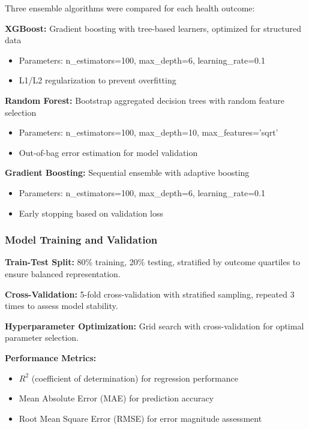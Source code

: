 \documentclass[11pt,a4paper]{article}
\begin{document}
Three ensemble algorithms were compared for each health outcome:

\textbf{XGBoost:} Gradient boosting with tree-based learners, optimized for structured data \cite{chen2016xgboost}
\begin{itemize}
\item Parameters: n\_estimators=100, max\_depth=6, learning\_rate=0.1
\item L1/L2 regularization to prevent overfitting
\end{itemize}

\textbf{Random Forest:} Bootstrap aggregated decision trees with random feature selection \cite{breiman2001random}
\begin{itemize}
\item Parameters: n\_estimators=100, max\_depth=10, max\_features='sqrt'
\item Out-of-bag error estimation for model validation
\end{itemize}

\textbf{Gradient Boosting:} Sequential ensemble with adaptive boosting \cite{friedman2001greedy}
\begin{itemize}
\item Parameters: n\_estimators=100, max\_depth=6, learning\_rate=0.1
\item Early stopping based on validation loss
\end{itemize}

\subsubsection{Model Training and Validation}

\textbf{Train-Test Split:} 80\% training, 20\% testing, stratified by outcome quartiles to ensure balanced representation.

\textbf{Cross-Validation:} 5-fold cross-validation with stratified sampling, repeated 3 times to assess model stability.

\textbf{Hyperparameter Optimization:} Grid search with cross-validation for optimal parameter selection.

\textbf{Performance Metrics:} 
\begin{itemize}
\item $R^2$ (coefficient of determination) for regression performance
\item Mean Absolute Error (MAE) for prediction accuracy
\item Root Mean Square Error (RMSE) for error magnitude assessment
\end{itemize}
\end{document}

